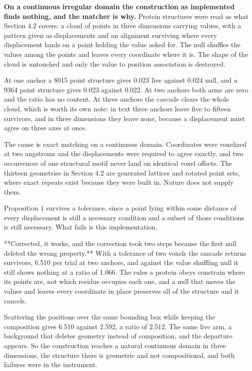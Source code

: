 \textbf{On a continuous irregular domain the construction as implemented finds nothing, and the matcher is why.} Protein structures were read as what Section 4.2 covers: a cloud of points in three dimensions carrying values, with a pattern given as displacements and an alignment surviving where every displacement lands on a point holding the value asked for. The null shuffles the values among the points and leaves every coordinate where it is. The shape of the cloud is untouched and only the value to position association is destroyed.

At one anchor a 8015 point structure gives 0.023 live against 0.024 null, and a 9364 point structure gives 0.023 against 0.022. At two anchors both arms are zero and the ratio has no content. At three anchors the cascade clears the whole cloud, which is worth its own note: in text three anchors leave five to fifteen survivors, and in three dimensions they leave none, because a displacement must agree on three axes at once.

The cause is exact matching on a continuous domain. Coordinates were voxelized at two angstroms and the displacements were required to agree exactly, and two occurrences of one structural motif never land on identical voxel offsets. The thirteen geometries in Section 4.2 are generated lattices and rotated point sets, where exact repeats exist because they were built in. Nature does not supply them.

Proposition 1 survives a tolerance, since a point lying within some distance of every displacement is still a necessary condition and a subset of those conditions is still necessary. What fails is this implementation.

**Corrected, it works, and the correction took two steps because the first null deleted the wrong property.** With a tolerance of two voxels the cascade returns survivors, 6.510 per trial at two anchors, and against the value shuffling null it still shows nothing at a ratio of 1.066. The rules a protein obeys constrain where its points are, not which residue occupies each one, and a null that moves the values and leaves every coordinate in place preserves all of the structure and it cancels.

Scattering the positions over the same bounding box while keeping the composition gives 6.510 against 2.592, a ratio of 2.512. The same live arm, a background that deletes geometry instead of composition, and the departure appears. So the construction reaches a natural continuous domain in three dimensions, the structure there is geometric and not compositional, and both failures were in the instrument.

